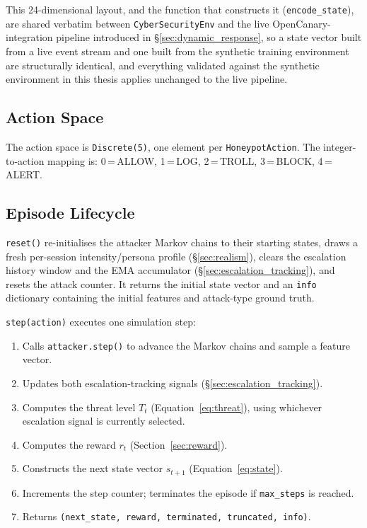 This 24-dimensional layout, and the function that constructs it
(\texttt{encode\_state}), are shared verbatim between
\texttt{CyberSecurityEnv} and the live OpenCanary-integration pipeline
introduced in \S\ref{sec:dynamic_response}, so a state vector built from a
live event stream and one built from the synthetic training environment are
structurally identical, and everything validated against the synthetic
environment in this thesis applies unchanged to the live pipeline.

\subsection{Action Space}

The action space is \texttt{Discrete(5)}, one element per \texttt{HoneypotAction}.
The integer-to-action mapping is: 0\,=\,ALLOW, 1\,=\,LOG, 2\,=\,TROLL,
3\,=\,BLOCK, 4\,=\,ALERT.

\subsection{Episode Lifecycle}

\texttt{reset()} re-initialises the attacker Markov chains to their starting
states, draws a fresh per-session intensity/persona profile
(\S\ref{sec:realism}), clears the escalation history window and the EMA
accumulator (\S\ref{sec:escalation_tracking}), and resets the attack counter.
It returns the initial state vector and an \texttt{info} dictionary containing
the initial features and attack-type ground truth.

\texttt{step(action)} executes one simulation step:
%
\begin{enumerate}
  \item Calls \texttt{attacker.step()} to advance the Markov chains and
        sample a feature vector.
  \item Updates both escalation-tracking signals (\S\ref{sec:escalation_tracking}).
  \item Computes the threat level $T_t$ (Equation~\ref{eq:threat}), using
        whichever escalation signal is currently selected.
  \item Computes the reward $r_t$ (Section~\ref{sec:reward}).
  \item Constructs the next state vector $s_{t+1}$
        (Equation~\ref{eq:state}).
  \item Increments the step counter; terminates the episode if
        \texttt{max\_steps} is reached.
  \item Returns \texttt{(next\_state, reward, terminated, truncated, info)}.
\end{enumerate}

